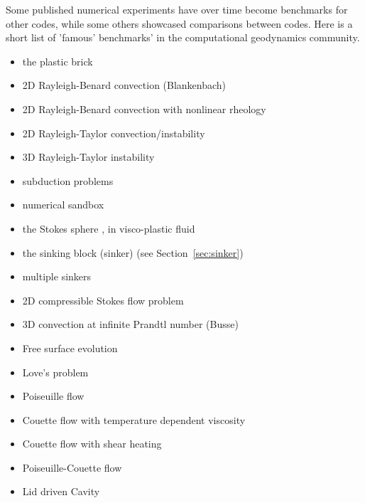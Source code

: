 Some published numerical experiments have over time become benchmarks for other codes, while some 
others showcased comparisons between codes. Here is a short list of 'famous' benchmarks' in the 
computational geodynamics community.

\begin{itemize}
\item the plastic brick \cite{lemm08,kaus10,qurj09,mishin11,maie12,spmw16,gltf18,frbt19}
\item 2D Rayleigh-Benard convection (Blankenbach)  \cite{blbc89,trha98,chhl08,king09,lezh11,vyrc13,trab90,bepo10,chgs02}
\item 2D Rayleigh-Benard convection with nonlinear rheology \cite{tosn15,aspectmanual}
\item 2D Rayleigh-Taylor convection/instability \cite{pros81,trab90,wesc92,popo92,soga01,bast02,taki03,bomh06}
      \cite{basd08,qurj09,saev10,como97,lezh11,lomw12,vyrc13,vaks97,bomh06,chtl13,deka08,mishin11,maie12}
      \cite{fusc13,devv00a,dadh07,demh19,aspectmanual}
\item 3D Rayleigh-Taylor instability \cite{fukk08,vosc15}
\item subduction problems \cite{scbe08,vack08,cehg14}
\item numerical sandbox \cite{bbeg06,maie12,busa16,gltf18}
\item the Stokes sphere \cite{galemanual,aspectmanual}, in visco-plastic fluid \cite{bemj04}
\item the sinking block (sinker) \cite{thie11,cehg14,gery10,geyu03,mamo08,mishin11,fumt11,maie12} (see Section~\ref{sec:sinker})
\item multiple sinkers \cite{mabl14,mabl15}
\item 2D compressible Stokes flow problem \cite{itki94,tagu07,lezh08,kilv10,lizh13}
\item 3D convection at infinite Prandtl number (Busse) \cite{bucc93,trha98,omma06,krhb12}
\item Free surface evolution \cite{crsg12,aspectmanual}
\item Love's problem \cite{bebe04}
\item Poiseuille flow \cite{fojg94,fuku11,tagm09}
\item Couette flow with temperature dependent viscosity \cite{egat10,demh19}
\item Couette flow with shear heating \cite{egat10}
\item Poiseuille-Couette flow \cite{fusc13}
\item Lid driven Cavity \cite{foth79,ghgs82,bope98,kawa61,brsa06}

\end{itemize}
